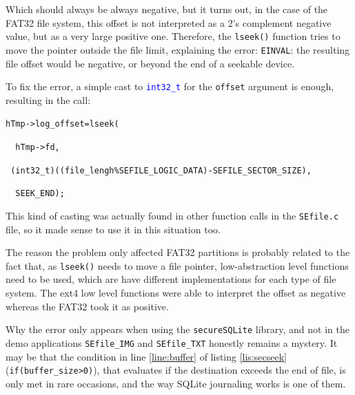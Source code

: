 Which should always be always negative, but it turns out, in the case of the FAT32 file system, this offset is not interpreted as a 2's complement negative value, but as a very large positive one. Therefore, the \texttt{lseek()} function tries to move the pointer outside the file limit, explaining the error: \texttt{EINVAL}: the resulting file offset would be negative, or beyond the end of a seekable device.

\vspace{7pt}
To fix the error, a simple cast to \texttt{\textcolor{blue}{int32\_t}} for the \texttt{offset} argument is enough, resulting in the call:
\vspace{5pt}

\lstinline|hTmp->log_offset=lseek(|

\lstinline|  hTmp->fd,| 

\lstinline| (int32_t)((file_lengh%SEFILE_LOGIC_DATA)-SEFILE_SECTOR_SIZE),| 

\lstinline|  SEEK_END);|
\vspace{7pt}

This kind of casting was actually found in other function calls in the \texttt{SEfile.c} file, so it made sense to use it in this situation too.

\vspace{7pt}
The reason the problem only affected FAT32 partitions is probably related to the fact that, as \texttt{lseek()} needs to move a file pointer, low-abstraction level functions need to be used, which are have different implementations for each type of file system. The ext4 low level functions were able to interpret the offset as negative whereas the FAT32 took it as positive.

Why the error only appears when using the \texttt{secureSQLite} library, and not in the demo applications \texttt{SEfile\_IMG} and \texttt{SEfile\_TXT} honestly remains a mystery. It may be  that the condition in line \ref{line:buffer} of listing \ref{lis:secseek} (\lstinline|if(buffer_size>0)|), that evaluates if the destination exceeds the end of file, is only met in rare occasions, and the way SQLite journaling works is one of them.
